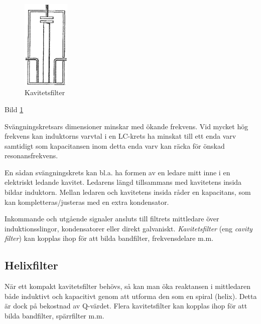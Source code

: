 \begin{figure}
  \includegraphics[width=0.2\textwidth]{images/cropped_pdfs/bild_2_3-31.pdf}
  \caption{Kavitetsfilter}
  \label{fig:BildII3-31}
\end{figure}

Bild \ref{fig:BildII3-31}

Svängningskretsars dimensioner minskar med ökande frekvens. Vid mycket hög
frekvens kan induktorns varvtal i en LC-krets ha minskat till ett enda varv
samtidigt som kapacitansen inom detta enda varv kan räcka för önskad
resonansfrekvens.

En sådan svängningskrets kan bl.a. ha formen av en ledare mitt inne i en
elektriskt ledande kavitet. Ledarens längd tillsammans med kavitetens insida
bildar induktorn. Mellan ledaren och kavitetens insida råder en kapacitans,
som kan kompletteras/justeras med en extra kondensator.

Inkommande och utgående signaler ansluts till filtrets mittledare över
induktionsslingor, kondensatorer eller direkt galvaniskt. \emph{Kavitetsfilter} (eng
\emph{cavity filter}) kan kopplas ihop för att bilda bandfilter, frekvensdelare
m.m.

\subsection{Helixfilter}

När ett kompakt kavitetsfilter behövs, så kan man öka reaktansen i mittledaren
både induktivt och kapacitivt genom att utforma den som en spiral (helix).
Detta är dock på bekostnad av Q-värdet. Flera kavitetsfilter kan kopplas ihop
för att bilda bandfilter, spärrfilter m.m.

